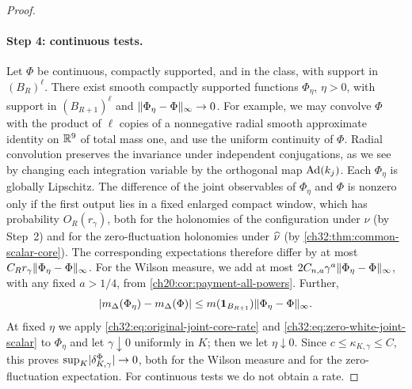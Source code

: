 \begin{proof}
\paragraph{Step 4: continuous tests.}
Let $\Phi$ be continuous, compactly supported, and in the class, with support in $(B_R)^\ell$. There exist smooth compactly supported functions $\Phi_\eta$, $\eta>0$, with support in $(B_{R+1})^\ell$ and $\lVert \Phi_\eta-\Phi\rVert_\infty\to0$. For example, we may convolve $\Phi$ with the product of $\ell$ copies of a nonnegative radial smooth approximate identity on $\mathbb R^9$ of total mass one, and use the uniform continuity of $\Phi$. Radial convolution preserves the invariance under independent conjugations, as we see by changing each integration variable by the orthogonal map $\operatorname{Ad}(k_j)$. Each $\Phi_\eta$ is globally Lipschitz. The difference of the joint observables of $\Phi_\eta$ and $\Phi$ is nonzero only if the first output lies in a fixed enlarged compact window, which has probability $O_R(r_\gamma)$, both for the holonomies of the configuration under $\nu$ (by Step~2) and for the zero-fluctuation holonomies under $\widehat\nu$ (by \cref{ch32:thm:common-scalar-core}). The corresponding expectations therefore differ by at most $C_Rr_\gamma\lVert \Phi_\eta-\Phi\rVert_\infty$. For the Wilson measure, we add at most $2C_{n,a}\gamma^a\lVert \Phi_\eta-\Phi\rVert_\infty$, with any fixed $a>1/4$, from \cref{ch20:cor:payment-all-powers}. Further,
\[
 \lvert m_\Delta(\Phi_\eta)-m_\Delta(\Phi)\rvert\le m(\mathbf 1_{B_{R+1}})\lVert \Phi_\eta-\Phi\rVert_\infty.
\]
At fixed $\eta$ we apply \eqref{ch32:eq:original-joint-core-rate} and \eqref{ch32:eq:zero-white-joint-scalar} to $\Phi_\eta$ and let $\gamma\downarrow0$ uniformly in $K$; then we let $\eta\downarrow0$. Since $c\le\kappa_{K,\gamma}\le C$, this proves $\sup_K\lvert \delta^\Phi_{K,\gamma}\rvert\to0$, both for the Wilson measure and for the zero-fluctuation expectation. For continuous tests we do not obtain a rate.


\end{proof}
